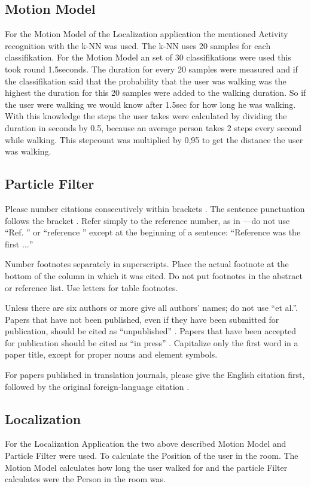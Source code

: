 \documentclass[conference]{IEEEtran}
\begin{document}
\subsection*{Motion Model}
For the Motion Model of the Localization application the mentioned Activity recognition with the k-NN was used. The k-NN uses 20 samples for each classifikation. For the Motion Model an set of 30 classifikations were used this took round 1.5seconds. The duration for every 20 samples were measured and if the classifikation said that the probability that the user was walking was the highest the duration for this 20 samples were added to the walking duration. So if the user were walking we would know after 1.5sec for how long he was walking. With this knowledge the steps the user takes were calculated by dividing the duration in seconds by 0.5, because an average person takes 2 steps every second while walking. This stepcount was multiplied by 0,95 to get the distance the user was walking.

\subsection*{Particle Filter}
Please number citations consecutively within brackets \cite{b1}. The 
sentence punctuation follows the bracket \cite{b2}. Refer simply to the reference 
number, as in \cite{b3}---do not use ``Ref. \cite{b3}'' or ``reference \cite{b3}'' except at 
the beginning of a sentence: ``Reference \cite{b3} was the first $\ldots$''

Number footnotes separately in superscripts. Place the actual footnote at 
the bottom of the column in which it was cited. Do not put footnotes in the 
abstract or reference list. Use letters for table footnotes.

Unless there are six authors or more give all authors' names; do not use 
``et al.''. Papers that have not been published, even if they have been 
submitted for publication, should be cited as ``unpublished'' \cite{b4}. Papers 
that have been accepted for publication should be cited as ``in press'' \cite{b5}. 
Capitalize only the first word in a paper title, except for proper nouns and 
element symbols.

For papers published in translation journals, please give the English 
citation first, followed by the original foreign-language citation \cite{b6}.

\subsection*{Localization}
For the Localization Application the two above described Motion Model and Particle Filter were used. To calculate the Position of the user in the room. The Motion Model calculates how long the user walked for and the particle Filter calculates were the Person in the room was.
\end{document}
